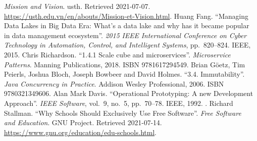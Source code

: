 \begin{thebibliography}{69}
   \emph{Mission and Vision}.
    \acrlong{usth}.  Retrieved 2021-07-07.
    \url{https://usth.edu.vn/en/abouts/Mission-et-Vision.html}.
   Huang Fang.
    ``Managing Data Lakes in Big Data Era: What's a data lake
    and why has it became popular in data management ecosystem''.
    \emph{2015 IEEE International Conference on Cyber Technology
    in Automation, Control, and Intelligent Systems}, pp.~820--824.
    IEEE, 2015.  
   Chris Richardson.
    ``1.4.1 Scale cube and microservices''.  \emph{Microservice Patterns}.
    Manning Publications, 2018.  ISBN 9781617294549.
   Brian Göetz, Tim Peierls, Joshua Bloch,
    Joseph Bowbeer and David Holmes.
    ``3.4. Immutability''.  \emph{Java Concurrency in Practice}.
    Addison Wesley Professional, 2006.  ISBN 9780321349606.
   Alan Mark Davis.
    ``Operational Prototyping: A new Development Approach''.
    \emph{IEEE Software}, vol.~9, no.~5, pp.~70--78.
    IEEE, 1992.  .
   Richard Stallman.
    ``Why Schools Should Exclusively Use Free Software''.
    \emph{Free Software and Education}.  GNU Project.  Retrieved 2021-07-14.
    \url{https://www.gnu.org/education/edu-schools.html}.
\end{thebibliography}
